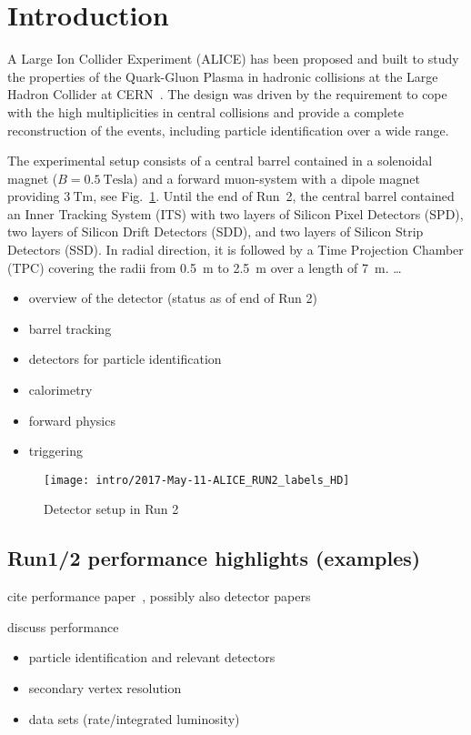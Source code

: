 \section{Introduction}

A Large Ion Collider Experiment (ALICE) has been proposed and built to study
the properties of the Quark-Gluon Plasma in hadronic collisions at the Large
Hadron Collider at CERN~\cite{Aamodt:2008zz}. The design was driven by the
requirement to cope with the high multiplicities in central \PbPb collisions
and provide a complete reconstruction of the events, including particle
identification over a wide \pt range.

The experimental setup consists of a central barrel contained in a solenoidal
magnet ($B = 0.5~\mathrm{Tesla}$) and a forward muon-system with a dipole magnet
providing $3~\mathrm{Tm}$, see Fig.~\ref{fig:alice_run2}. Until the end of Run~2,
the central barrel contained an Inner Tracking System (ITS) with two layers of
Silicon Pixel Detectors (SPD), two layers of Silicon Drift Detectors (SDD), and
two layers of Silicon Strip Detectors (SSD). In radial direction, it is followed
by a Time Projection Chamber (TPC) covering the radii from 0.5~m to 2.5~m over a
length of 7~m. \dots

\begin{itemize}
\item overview of the detector
  (status as of end of Run 2)
\item barrel tracking
\item detectors for particle identification
\item calorimetry
\item forward physics
\item triggering
\end{itemize}

\begin{figure}
\centering
\texttt{[image: intro/2017-May-11-ALICE\_RUN2\_labels\_HD]}
\caption{Detector setup in Run 2}
\label{fig:alice_run2}
\end{figure}

\subsection{Run1/2 performance highlights (examples)}

cite performance paper~\cite{Abelev:2014ffa}, possibly also detector papers

discuss performance
\begin{itemize}
\item particle identification and relevant detectors
\item secondary vertex resolution
\item data sets (rate/integrated luminosity)
\end{itemize}

